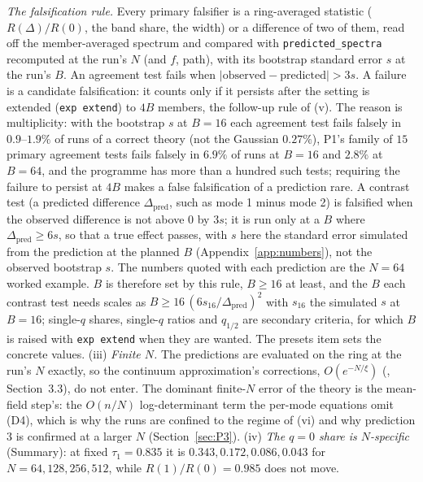 \documentclass[11pt,a4paper]{article}
\newcommand{\code}[1]{\texttt{#1}}
\begin{document}
\emph{The falsification rule.} Every primary falsifier is a ring-averaged statistic ($R(\Delta)/R(0)$, the band share, the width) or a difference of two of them, read off the member-averaged spectrum and compared with \code{predicted\_spectra} recomputed at the run's $N$ (and $f$, path), with its bootstrap standard error $s$ at the run's $B$. An agreement test fails when $|\text{observed} - \text{predicted}| > 3s$. A failure is a candidate falsification: it counts only if it persists after the setting is extended (\code{exp extend}) to $4B$ members, the follow-up rule of (v). The reason is multiplicity: with the bootstrap $s$ at $B = 16$ each agreement test fails falsely in $0.9$--$1.9\%$ of runs of a correct theory (not the Gaussian $0.27\%$), P1's family of $15$ primary agreement tests fails falsely in $6.9\%$ of runs at $B = 16$ and $2.8\%$ at $B = 64$, and the programme has more than a hundred such tests; requiring the failure to persist at $4B$ makes a false falsification of a prediction rare. A contrast test (a predicted difference $\Delta_{\mathrm{pred}}$, such as mode 1 minus mode 2) is falsified when the observed difference is not above $0$ by $3s$; it is run only at a $B$ where $\Delta_{\mathrm{pred}}\ge6s$, so that a true effect passes, with $s$ here the standard error simulated from the prediction at the planned $B$ (Appendix~\ref{app:numbers}), not the observed bootstrap $s$. The numbers quoted with each prediction are the $N = 64$ worked example. $B$ is therefore set by this rule, $B\ge16$ at least, and the $B$ each contrast test needs scales as $B\ge16\,(6s_{16}/\Delta_{\mathrm{pred}})^2$ with $s_{16}$ the simulated $s$ at $B = 16$; single-$q$ shares, single-$q$ ratios and $q_{1/2}$ are secondary criteria, for which $B$ is raised with \code{exp extend} when they are wanted. The presets item sets the concrete values. (iii) \emph{Finite $N$.} The predictions are evaluated on the ring at the run's $N$ exactly, so the continuum approximation's corrections, $O(e^{-N/\xi})$ (, Section~3.3), do not enter. The dominant finite-$N$ error of the theory is the mean-field step's: the $O(n/N)$ log-determinant term the per-mode equations omit (D4), which is why the runs are confined to the regime of (vi) and why prediction 3 is confirmed at a larger $N$ (Section~\ref{sec:P3}). (iv) \emph{The $q = 0$ share is $N$-specific} (Summary): at fixed $\tau_1 = 0.835$ it is $0.343, 0.172, 0.086, 0.043$ for $N = 64, 128, 256, 512$, while $R(1)/R(0) = 0.985$ does not move.
\end{document}
